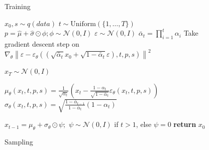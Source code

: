 \documentclass{article}
\begin{document}
\algrenewcommand\algorithmicindent{0.5em}%
\begin{figure}[t]
\begin{minipage}[t]{0.495\textwidth}
\begin{algorithm}[H]
  \caption{Training} \label{alg:training}
  \setlength{\belowdisplayskip}{-10pt}
  \small
  \begin{algorithmic}[1]
    \Repeat
      \State $x_0, s \sim q(data)$
      \State $t \sim \mathrm{Uniform}(\{1, \dotsc, T\})$
      \State $p = {\hat{\mu}} + {\hat{\sigma}} \odot \phi ; \phi \sim \mathcal{N}(0, I)$
      \State $\varepsilon \sim \mathcal{N}(0, I)$
      \State $\bar{\alpha}_t = \prod_{i=1}^t\alpha_i$
      \State Take gradient descent step on
        \Statex $\nabla _\theta \left\| \varepsilon - \varepsilon_\theta((\sqrt{\bar\alpha_t} x_0 + \sqrt{1-\bar\alpha_t}\varepsilon), t, p, s) \right\|^2$
  \end{algorithmic}
\end{algorithm}
\end{minipage}

\hfill
\begin{minipage}[t]{0.495\textwidth}
\begin{algorithm}[H]
  \caption{Sampling} \label{alg:sampling}
  \small
  \begin{algorithmic}[1]
    \vspace{.04in}
    \State $x_T \sim \mathcal{N}(0, I)$
      
      \State $\mu_{\theta}(x_t, t, p, s) = \frac{1}{\sqrt{\alpha_t}}\left( x_t - \frac{1-\alpha_t}{\sqrt{1-\bar\alpha_t}} \varepsilon_\theta(x_t, t, p, s) \right)$
      \State $\sigma_{\theta}(x_t, t, p, s) =  \sqrt{\frac{1-\bar{\alpha}_{t-1}}{1-\bar{\alpha}_t}(1-\alpha_t)}$
      
      \State $x_{t-1} = \mu_{\theta} + \sigma_{\theta} \odot \psi; $ $\psi \sim \mathcal{N}(0, I)$ if $t > 1$, else $\psi = 0$
    \EndFor
    \State \textbf{return} $x_0$
    \vspace{.04in}
  \end{algorithmic}
\end{algorithm}
\end{minipage}
\vspace{-1em}
\end{figure}
\end{document}
